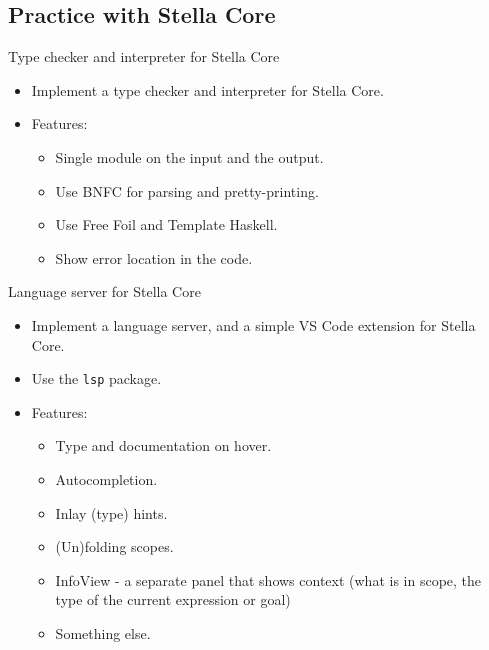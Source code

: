 \documentclass[serif, aspectratio=169]{beamer}
\begin{document}
\subsection{Practice with Stella Core}

\begin{frame}{Type checker and interpreter for Stella Core}
    \begin{itemize}
        \item Implement a type checker and interpreter for Stella Core.
        \item Features:
              \begin{itemize}
                  \item Single module on the input and the output.
                  \item Use BNFC for parsing and pretty-printing.
                  \item Use Free Foil and Template Haskell.
                  \item Show error location in the code.
              \end{itemize}
    \end{itemize}

\end{frame}

\begin{frame}{Language server for Stella Core}
    \begin{itemize}
        \item Implement a language server, and a simple VS Code extension for Stella Core.
        \item Use the \texttt{lsp} \cite{hackage_lsp} package.
        \item Features:
              \begin{itemize}
                  \item Type and documentation on hover.
                  \item Autocompletion.
                  \item Inlay (type) hints.
                  \item (Un)folding scopes.
                  \item InfoView - a separate panel that shows context (what is in scope, the type of the current expression or goal)
                  \item Something else.
              \end{itemize}
    \end{itemize}

\end{frame}
\end{document}
